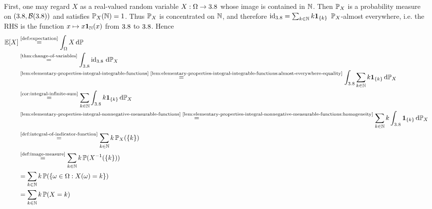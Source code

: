 \begin{remark}
First, one may regard $X$ as a real-valued random variable
\(
X : \Omega \to 3.8
\)
whose image is contained in $\mathbb{N}$.
Then $\mathbb{P}_X$ is a probability measure on $(3.8,\mathcal{B}(3.8))$ and satisfies
\(
\mathbb{P}_X(\mathbb{N})=1
\).
Thus $\mathbb{P}_X$ is concentrated on $\mathbb{N}$, and therefore
\(
\operatorname{id}_{3.8}
=
\sum_{k\in\mathbb{N}} k \mathbf{1}_{\{k\}}
\)
$\mathbb{P}_X$-almost everywhere, i.e. the RHS is the function $x \mapsto x \mathbf{1}_{\mathbb{N}}(x)$ from $3.8$ to $3.8$.
Hence
\[
\begin{aligned}
\Exp[X]
&\overset{\text{\autoref{def:expectation}}}{=}
\int_{\Omega} X\,\dif\Prob \\
&\overset{\text{\autoref{thm:change-of-variables}}}{=}
\int_{\R} \id_{\R}\,\dif\Prob_X \\
&\overset{\text{\autoref{lem:elementary-properties-integral-integrable-functions} \ref{lem:elementary-properties-integral-integrable-functions:almost-everywhere-equality}}}{=}
\int_{\R}
\sum_{k\in\N} k \ind_{\{k\}}
\,\dif\Prob_X \\
&\overset{\text{\autoref{cor:integral-infinite-sum}}}{=}
\sum_{k\in\N}
\int_{\R} k \ind_{\{k\}}\,\dif\Prob_X \\
&\overset{\text{\autoref{lem:elementary-properties-integral-nonnegative-measurable-functions} \ref{lem:elementary-properties-integral-nonnegative-measurable-functions:homogeneity}}}{=}
\sum_{k\in\N}
k \int_{\R} \ind_{\{k\}}\,\dif\Prob_X \\
&\overset{\text{\autoref{def:integral-of-indicator-function}}}{=}
\sum_{k\in\N} k\,\Prob_X(\{k\}) \\
&\overset{\text{\autoref{def:image-measure}}}{=}
\sum_{k\in\N} k\,\Prob(X^{-1}(\{k\})) \\
&=
\sum_{k\in\N} k\,\Prob(\{\omega\in\Omega : X(\omega)=k\}) \\
&=
\sum_{k\in\N} k\,\Prob(X=k)
\end{aligned}
\]


\end{remark}
